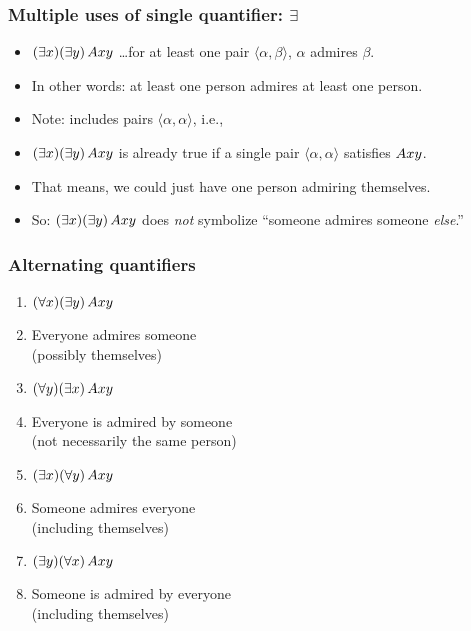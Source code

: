 \begin{frame}
  \frametitle{Multiple uses of single quantifier: $\exists$}

\begin{itemize}[<+->]
  \item $(\exists x)(\exists y)\, Axy$ \dots for at least one pair $\langle \alpha,\beta\rangle$, $\alpha$ admires $\beta$.
  \item In other words: at least one person admires at least one person.
  \item Note: includes pairs $\langle\alpha, \alpha\rangle$, i.e.,
  \item $(\exists x)(\exists y)\, Axy$ is already true if a single pair $\langle \alpha, \alpha\rangle$ satisfies $ Axy$.
  \item That means, we could just have one person admiring themselves.
  \item So: $(\exists x)(\exists y)\, Axy$ does \emph{not} symbolize ``someone admires someone \emph{else}.''
\end{itemize}
\end{frame}

\begin{frame}
    \frametitle{Alternating quantifiers}

\begin{enumerate}[<+->]
  \item $(\forall x) (\exists y) \, Axy$
  \item<2->[] Everyone admires someone\\
    (possibly themselves)
  \item $(\forall y) (\exists x) \, Axy$
  \item<3->[] Everyone is admired by someone\\
  (not necessarily the same person)
  \item $(\exists x) (\forall y) \, Axy$
  \item<4->[] Someone admires everyone\\
  (including themselves)
  \item $(\exists y) (\forall x) \, Axy$
  \item<5->[] Someone is admired by everyone\\
    (including themselves)
\end{enumerate}

\end{frame}

